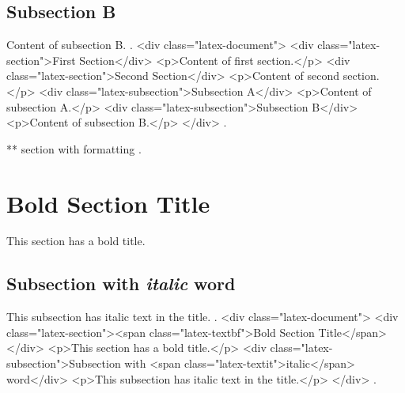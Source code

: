 \subsection{Subsection B}
Content of subsection B.
.
<div class="latex-document">
<div class="latex-section">First Section</div>
<p>Content of first section.</p>
<div class="latex-section">Second Section</div>
<p>Content of second section.</p>
<div class="latex-subsection">Subsection A</div>
<p>Content of subsection A.</p>
<div class="latex-subsection">Subsection B</div>
<p>Content of subsection B.</p>
</div>
.


** section with formatting
.
\section{\textbf{Bold Section Title}}
This section has a bold title.

\subsection{Subsection with \textit{italic} word}
This subsection has italic text in the title.
.
<div class="latex-document">
<div class="latex-section"><span class="latex-textbf">Bold Section Title</span></div>
<p>This section has a bold title.</p>
<div class="latex-subsection">Subsection with <span class="latex-textit">italic</span> word</div>
<p>This subsection has italic text in the title.</p>
</div>
.
